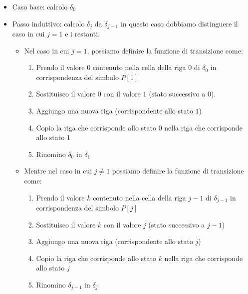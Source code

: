 \begin{itemize}
    \item Caso base: calcolo $\delta_0$
    \item Passo induttivo: calcolo $\delta_j$ da $\delta_{j - 1}$ in questo caso
          dobbiamo distinguere il caso in cui $j = 1$ e i restanti.
          \begin{itemize}
              \item Nel caso in cui $j = 1$, possiamo definire la funzione di
                    transizione come:
                    \begin{enumerate}
                        \item Prendo il valore $0$ contenuto nella cella della
                              riga $0$ di $\delta_0$ in corrispondenza del simbolo $P[1]$
                        \item Sostituisco il valore $0$ con il valore $1$ (stato
                              successivo a $0$).
                        \item Aggiungo una nuova riga (corrispondente allo stato $1$)
                        \item Copio la riga che corrisponde allo stato 0 nella riga
                              che corrisponde allo stato $1$
                        \item Rinomino $\delta_0$ in $\delta_1$
                    \end{enumerate}
              \item Mentre nel caso in cui $j \neq 1$ possiamo definire la
                    funzione di transizione come:
                    \begin{enumerate}
                        \item Prendo il valore $k$ contenuto nella cella della
                              riga $j-1$ di $\delta_{j-1}$ in corrispondenza del simbolo $P[j]$
                        \item Sostituisco il valore $k$ con il valore $j$ (stato
                              successivo a $j - 1$)
                        \item Aggiungo una nuova riga (corrispondente allo stato $j$)
                        \item Copio la riga che corrisponde allo stato $k$ nella
                              riga che corrisponde allo stato $j$
                        \item Rinomino $\delta_{j-1}$ in $\delta_j$
                    \end{enumerate}
          \end{itemize}
\end{itemize}
